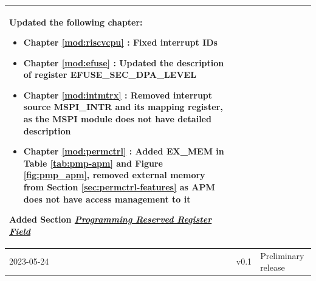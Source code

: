 \begin{longtable}[l]{ | m{2cm} | m{1.5cm} | m{12cm} | }
\begin{itemize}
    \end{itemize}
    Updated the following chapter:
    \begin{itemize}
        \item Chapter \ref{mod:riscvcpu} \textit{\nameref{mod:riscvcpu}}: Fixed interrupt IDs %
        \item Chapter \ref{mod:efuse} \textit{\nameref{mod:efuse}}: Updated the description of register EFUSE\_SEC\_DPA\_LEVEL %
        \item Chapter \ref{mod:intmtrx} \textit{\nameref{mod:intmtrx}}: Removed interrupt source MSPI\_INTR and its mapping register, as the MSPI module does not have detailed description %
        \item Chapter \ref{mod:permctrl} \textit{\nameref{mod:permctrl}}: Added EX\_MEM in Table \ref{tab:pmp-apm} and Figure \ref{fig:pmp_apm}, removed external memory from Section \ref{sec:permctrl-features} \textit{\nameref{sec:permctrl-features}} as APM does not have access management to it
    \end{itemize}
    Added Section \hyperref[programming-reserved-field]{\textit{Programming Reserved Register Field}}
    \\\hline
    2023-05-24 & v0.1 & Preliminary release \\\hline
\end{longtable}
